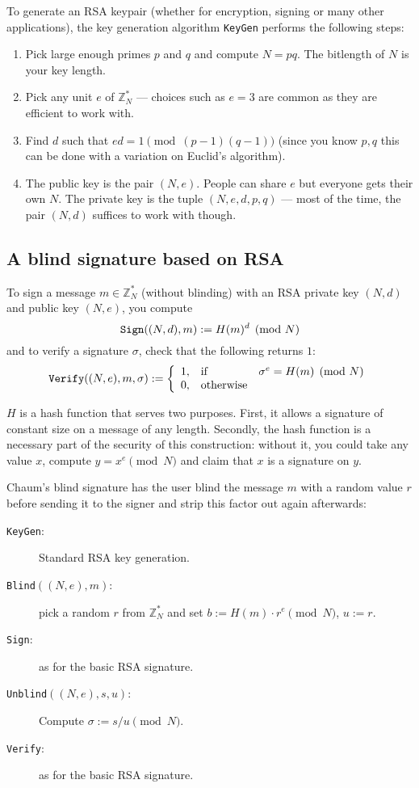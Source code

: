 \documentclass[envcountsame]{llncs}
\newcommand{\alg}[1]{\textup{\texttt{#1}}}
\newenvironment{maths}{\begin{framed}
\vspace{-12pt}
\begin{wrapfigure}{l}{0.15\textwidth}
\vspace{-12pt}\quad{\Huge $\sum$}
\end{wrapfigure}}{\end{framed}}
\begin{document}
\begin{maths}
To generate an RSA keypair (whether for encryption, signing or many other
applications), the key generation algorithm \alg{KeyGen} performs the following
steps:
\begin{enumerate}
\item Pick large enough primes $p$ and $q$ and compute $N = pq$. The bitlength
of $N$ is your key length.
\item Pick any unit $e$ of $\mathbb Z^*_N$ --- choices such as $e = 3$ are
common as they are efficient to work with.
\item Find $d$ such that $ed = 1 \pmod{(p-1)(q-1)}$ (since you know $p, q$ this
can be done with a variation on Euclid's algorithm).
\item The public key is the pair $(N, e)$. People can share $e$ but everyone
gets their own $N$. The private key is the tuple $(N, e, d, p, q)$ --- most of
the time, the pair $(N, d)$ suffices to work with though.
\end{enumerate}
\end{maths}

\subsection{A blind signature based on RSA}

To sign a message $m \in \mathbb Z^*_N$ (without blinding) with an RSA private
key $(N, d)$ and public key $(N, e)$, you compute
\[
\alg{Sign}((N, d), m) := H(m)^d \pmod{N}
\]
and to verify a signature $\sigma$, check that the following returns $1$:
\[
\alg{Verify}((N, e), m, \sigma) :=
\left\{ \begin{array}{lll}
1, & \textrm{if} & \sigma^e = H(m) \pmod{N} \\
0, & \textrm{otherwise} & \\
\end{array} \right.
\]

$H$ is a hash function that serves two purposes. First, it allows a signature of
constant size on a message of any length. Secondly, the hash function is a
necessary part of the security of this construction: without it, you could take
any value $x$, compute $y = x^e \pmod{N}$ and claim that $x$ is a signature on
$y$.

Chaum's blind signature has the user blind the message $m$ with a random value
$r$ before sending it to the signer and strip this factor out again afterwards:

\begin{description}
\item[\alg{KeyGen}:] Standard RSA key generation.
\item[\alg{Blind}$((N, e), m)$:] pick a random $r$ from $\mathbb Z^*_N$ and set
$b := H(m) \cdot r^e \pmod{N}$, $u := r$.
\item[\alg{Sign}:] as for the basic RSA signature.
\item[\alg{Unblind}$((N, e), s, u)$:] Compute $\sigma := s/u \pmod{N}$.
\item[\alg{Verify}:] as for the basic RSA signature.
\end{description}
\end{document}
